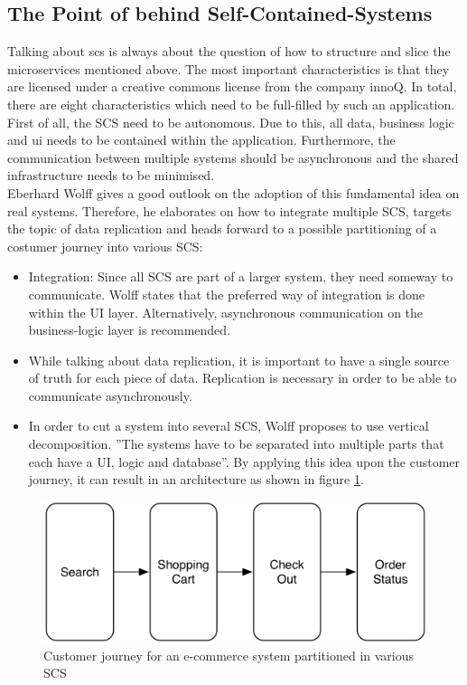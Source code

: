 \subsection{The Point of behind Self-Contained-Systems}
Talking about \acrfull{scs} is always about the question of how to structure and slice the microservices mentioned above.\newline
The most important characteristics is that they are licensed under a creative commons license from the company innoQ. In total, there are eight characteristics which need to be full-filled by such an application. First of all, the SCS need to be autonomous. Due to this, all data, business logic and \acrshort{ui} needs to be contained within the application. Furthermore, the communication between multiple systems should be asynchronous and the shared infrastructure needs to be minimised. \cite{scs}\newline
\\
Eberhard Wolff gives a good outlook on the adoption of this fundamental idea on real systems. Therefore, he elaborates on how to integrate multiple SCS, targets the topic of data replication and heads forward to a possible partitioning of a costumer journey into various SCS:\newline
\begin{itemize}
    \item Integration: Since all SCS are part of a larger system, they need someway to communicate. Wolff states that the preferred way of integration is done within the UI layer. Alternatively, asynchronous communication on the business-logic layer is recommended.
    \item While talking about data replication, it is important to have a single source of truth for each piece of data. Replication is necessary in order to be able to communicate asynchronously.
    \item In order to cut a system into several SCS, Wolff proposes to use vertical decomposition. ''The systems have to be separated into multiple parts that each have a UI, logic and database''\cite{scsWolf}. By applying this idea upon the customer journey, it can result in an architecture as shown in figure \ref{fig:scsJourney}.
\end{itemize}
\cite{scsWolf}\newline
\begin{figure}[!htb]
    \centering
    \includegraphics[scale=0.2]{pictures/Journey.png}
    \caption{Customer journey for an e-commerce system partitioned in various SCS \cite{scsWolf}}
    \label{fig:scsJourney}
\end{figure}

